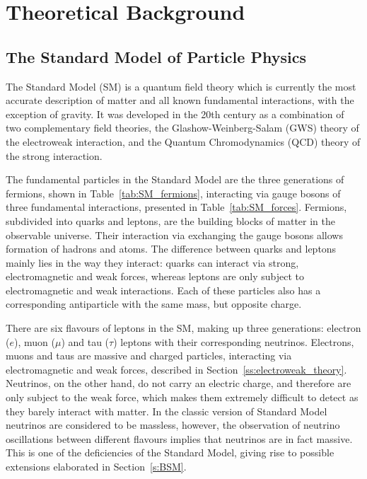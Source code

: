 
\chapter{Theoretical Background}
\label{c:theory}

\ifpdf
    \graphicspath{{02_Theory/plots/}}
\else
    \graphicspath{{02_Theory/plots/EPS/}{02_Theory/plots/}}
\fi

\section{The Standard Model of Particle Physics}
\label{s:SM}
The Standard Model (SM) is a quantum field theory which is currently the most accurate description of matter and all
known fundamental interactions, with the exception of gravity. It was developed in the 20th century as a combination of
two complementary field theories, the Glashow-Weinberg-Salam (GWS) \autocite{Glashow, Weinberg, Salam} theory of the
electroweak interaction, and the Quantum Chromodynamics (QCD) \autocite{Gell-Mann_1964, Gross_Wilczek, Politzer} theory
of the strong interaction.

The fundamental particles in the Standard Model are the three generations of fermions, shown in
Table~\ref{tab:SM_fermions}, interacting via gauge bosons of three fundamental interactions, presented in
Table~\ref{tab:SM_forces}. Fermions, subdivided into quarks and leptons, are the building blocks of matter in the
observable universe. Their interaction via exchanging the gauge bosons allows formation of hadrons and atoms. The
difference between quarks and leptons mainly lies in the way they interact: quarks can interact via strong,
electromagnetic and weak forces, whereas leptons are only subject to electromagnetic and weak interactions. Each of
these particles also has a corresponding antiparticle with the same mass, but opposite charge.

There are six flavours of leptons in the SM, making up three generations: electron ($e$), muon ($\mu$) and tau ($\tau$)
leptons with their corresponding neutrinos. Electrons, muons and taus are massive and charged particles, interacting via
electromagnetic and weak forces, described in Section~\ref{ss:electroweak_theory}. Neutrinos, on the other hand, do not
carry an electric charge, and therefore are only subject to the weak force, which makes them extremely difficult to
detect as they barely interact with matter. In the classic version of Standard Model neutrinos are considered to be
massless, however, the observation of neutrino oscillations between different flavours \autocite{neutrino_oscillations}
implies that neutrinos are in fact massive. This is one of the deficiencies of the Standard Model, giving rise to
possible extensions elaborated in Section~\ref{s:BSM}.


